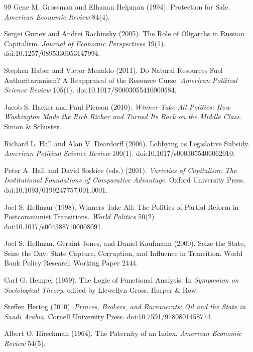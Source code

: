 \documentclass[11pt,letterpaper]{article}
\theoremstyle{definition}
\theoremstyle{remark}
\begin{document}
\begin{thebibliography}{99}
Gene M. Grossman and Elhanan Helpman (1994). Protection for Sale. \emph{American Economic Review} 84(4).

Sergei Guriev and Andrei Rachinsky (2005). The Role of Oligarchs in Russian Capitalism. \emph{Journal of Economic Perspectives} 19(1). doi:10.1257/0895330053147994.

Stephen Haber and Victor Menaldo (2011). Do Natural Resources Fuel Authoritarianism? A Reappraisal of the Resource Curse. \emph{American Political Science Review} 105(1). doi:10.1017/S0003055410000584.

Jacob S. Hacker and Paul Pierson (2010). \emph{Winner-Take-All Politics: How Washington Made the Rich Richer and Turned Its Back on the Middle Class}. Simon \& Schuster.

Richard L. Hall and Alan V. Deardorff (2006). Lobbying as Legislative Subsidy. \emph{American Political Science Review} 100(1). doi:10.1017/s0003055406062010.

Peter A. Hall and David Soskice (eds.) (2001). \emph{Varieties of Capitalism: The Institutional Foundations of Comparative Advantage}. Oxford University Press. doi:10.1093/0199247757.001.0001.

Joel S. Hellman (1998). Winners Take All: The Politics of Partial Reform in Postcommunist Transitions. \emph{World Politics} 50(2). doi:10.1017/s0043887100008091.

Joel S. Hellman, Geraint Jones, and Daniel Kaufmann (2000). Seize the State, Seize the Day: State Capture, Corruption, and Influence in Transition. World Bank Policy Research Working Paper 2444.

Carl G. Hempel (1959). The Logic of Functional Analysis. In \emph{Symposium on Sociological Theory}, edited by Llewellyn Gross, Harper \& Row.

Steffen Hertog (2010). \emph{Princes, Brokers, and Bureaucrats: Oil and the State in Saudi Arabia}. Cornell University Press. doi:10.7591/9780801458774.

Albert O. Hirschman (1964). The Paternity of an Index. \emph{American Economic Review} 54(5).


\end{thebibliography}
\end{document}
